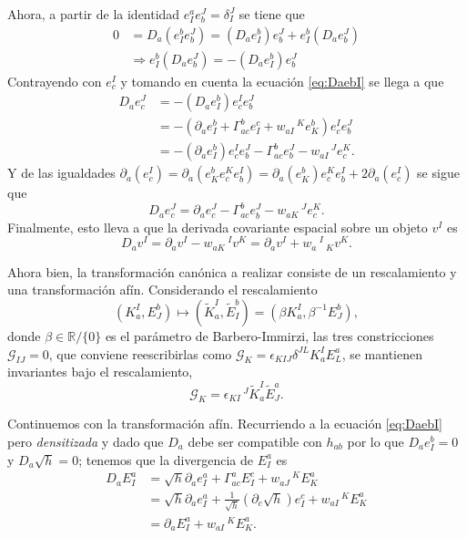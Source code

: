 Ahora, a partir de la identidad $e^{a}_{I} e^{J}_{b} = \delta^{J}_{I}$ se tiene que
%
\begin{align*}
0 & = D_{a} (e^{b}_{I} e^{J}_{b}) = (D_{a} e^{b}_{I}) e^{J}_{b} + e^{b}_{I} (D_{a} e^{J}_{b}) \\
& \Longrightarrow e^{b}_{I} (D_{a} e^{J}_{b}) = -(D_{a} e^{b}_{I}) e^{J}_{b}
\end{align*}
%
Contrayendo con $e^{I}_{c}$ y tomando en cuenta la ecuaci\'{o}n \eqref{eq:DaebI} se llega a que
%
\begin{align*}
D_{a} e^{J}_{c} & = -(D_{a} e^{b}_{I}) e^{I}_{c} e^{J}_{b} \\
& = -(\partial_{a} e^{b}_{I} + \Gamma^{b}_{ac} e^{c}_{I} + w_{aI}\,^{K} e^{b}_{K}) e^{I}_{c} e^{J}_{b} \\
& = -(\partial_{a} e^{b}_{I}) e^{I}_{c} e^{J}_{b} - \Gamma^{b}_{ac} e^{J}_{b} - w_{aI}\,^{J} e^{K}_{c}.
\end{align*}
%
Y de las igualdades $\partial_{a}(e^{I}_{c}) = \partial_{a}(e^{b}_{K} e^{K}_{c} e^{I}_{b}) = \partial_{a}(e^{b}_{K}) e^{K}_{c} e^{I}_{b} + 2 \partial_{a}(e^{I}_{c})$ se sigue que
%
\begin{equation}
D_{a} e^{J}_{c} = \partial_{a} e^{J}_{c} - \Gamma^{b}_{ac} e^{J}_{b} - w_{aK}\,^{J} e^{K}_{c}.
\end{equation}
%
Finalmente, esto lleva a que la derivada covariante espacial sobre un objeto $v^{I}$ es
%
\begin{equation}
D_{a} v^{I} = \partial_{a} v^{I} - w_{aK}\,^{I} v^{K} = \partial_{a} v^{I} + w_{a}\,^{I}\,_{K} v^{K}.
\end{equation}

Ahora bien, la transformaci\'{o}n can\'{o}nica a realizar consiste de un rescalamiento y una transformaci\'{o}n af\'{i}n. Considerando el rescalamiento
%
\begin{equation}
(K^{I}_{a}, E^{b}_{J}) \longmapsto (\tilde{K}^{I}_{a}, \tilde{E}^{b}_{I}) = (\beta K^{I}_{a}, \beta^{-1} E^{b}_{J}),
\end{equation}
%
donde $\beta \in \mathbb{R}/\{0\}$ es el par\'{a}metro de Barbero-Immirzi, las tres constricciones $\mathcal{G}_{IJ} = 0$, que conviene reescribirlas como $\mathcal{G}_{K} = \epsilon_{KIJ} \delta^{JL} K^{I}_{a} E^{a}_{L}$, se mantienen invariantes bajo el rescalamiento,
%
\begin{equation}
\mathcal{G}_{K} = \epsilon_{KI}\,^{J} \tilde{K}^{I}_{a} \tilde{E}^{a}_{J}.
\end{equation}

Continuemos con la transformaci\'{o}n af\'{i}n. Recurriendo a la ecuaci\'{o}n \eqref{eq:DaebI} pero \emph{densitizada} y dado que $D_{a}$ debe ser compatible con $h_{ab}$ por lo que $D_{a} e^{b}_{I} = 0$ y $D_{a} \sqrt{h} = 0$; tenemos que la divergencia de $E^{a}_{I}$ es
%
\begin{align*}
D_{a} E^{a}_{I} & = \sqrt{h} \partial_{a} e^{a}_{I} + \Gamma^{a}_{ac} E^{c}_{I} + w_{aJ}\,^{K} E^{a}_{K} \\
& = \sqrt{h} \partial_{a} e^{a}_{I} + \frac{1}{\sqrt{h}} (\partial_{c} \sqrt{h}) e^{c}_{I} + w_{aI}\,^{K} E^{a}_{K} \\
& = \partial_{a} E^{a}_{I} + w_{aI}\,^{K} E^{a}_{K}.
\end{align*}

